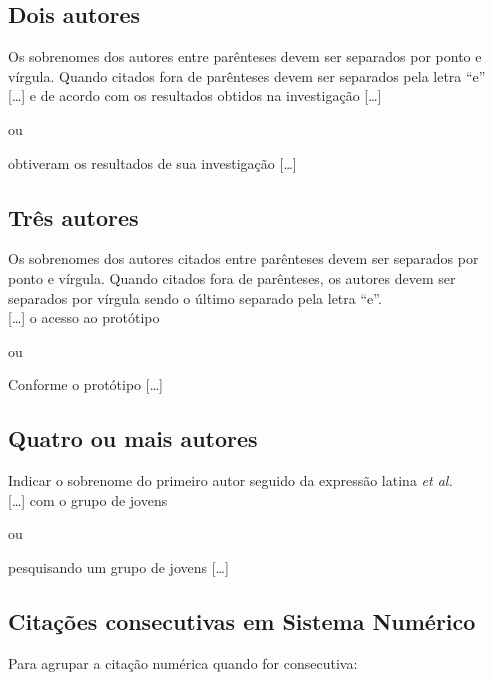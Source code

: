 \subsection{Dois autores}

Os sobrenomes dos autores entre parênteses devem ser separados por ponto e vírgula. Quando citados fora de parênteses devem ser separados pela letra “e”\\

[\ldots] \cite{Ramos2014} e de acordo com os resultados obtidos na investigação [\ldots] 

ou 

 obtiveram os resultados de sua investigação [\ldots] \\

\subsection{Três autores}

Os sobrenomes dos autores citados entre parênteses devem ser separados por ponto e vírgula. Quando citados fora de parênteses, os autores devem ser separados por vírgula sendo o último separado pela letra “e”.\\

[\ldots] o acesso ao protótipo \cite{Oliveira2013}

ou

Conforme  o protótipo [\ldots]\\

\subsection{Quatro ou mais autores}

Indicar o sobrenome do primeiro autor seguido da expressão latina \textit{et al.}\\

[\ldots]  com o grupo de jovens \cite{Sena2012}

ou

 pesquisando um grupo de jovens [\ldots]\\

\subsection{Citações consecutivas em Sistema Numérico}

Para agrupar a citação numérica quando for consecutiva:


